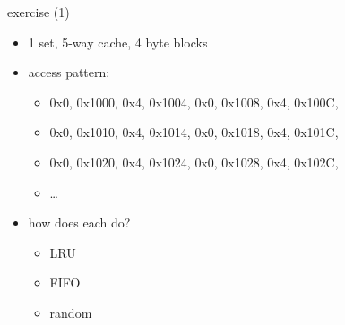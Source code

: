 \begin{frame}{exercise (1)}
    \begin{itemize}
    \item 1 set, 5-way cache, 4 byte blocks
    \item access pattern:
        \begin{itemize}
        \item 0x0, 0x1000, 0x4, 0x1004, 0x0, 0x1008, 0x4, 0x100C,
        \item 0x0, 0x1010, 0x4, 0x1014, 0x0, 0x1018, 0x4, 0x101C,
        \item 0x0, 0x1020, 0x4, 0x1024, 0x0, 0x1028, 0x4, 0x102C,
        \item \ldots
        \end{itemize}
    \item how does each do?
        \begin{itemize}
        \item LRU
        \item FIFO
        \item random
        \end{itemize}
    \end{itemize}
\end{frame}


